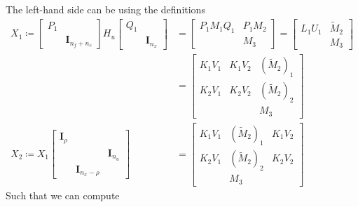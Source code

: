 \documentclass{article}
\begin{document}
The left-hand side can be using the definitions
\begin{align}
    X_1 \coloneqq \begin{bmatrix} P_1 & \\ & \bm{I}_{n_f + n_c} \end{bmatrix}
    H_u
    \begin{bmatrix} Q_1 & \\ & \bm{I}_{n_x}\end{bmatrix}
    &= \begin{bmatrix} P_1 M_1 Q_1 & P_1 M_2 \\ & M_3 \end{bmatrix}
     = \begin{bmatrix} L_1 U_1 & \tilde{M}_2 \\ & M_3 \end{bmatrix}\\
    &= \begin{bmatrix} K_1 V_1 & K_1 V_2 & (\tilde{M}_2)_1 \\ K_2 V_1 & K_2 V_2 & (\tilde{M}_2)_2 \\ & & M_3 \end{bmatrix}\\
    X_2 \coloneqq X_1 \begin{bmatrix} \bm{I}_\rho & & \\ & & \bm{I}_{n_u} \\ & \bm{I}_{n_x-\rho} & \end{bmatrix}
    &= \begin{bmatrix} K_1 V_1 & (\tilde{M}_2)_1 & K_1 V_2 \\ K_2 V_1 & (\tilde{M}_2)_2 & K_2 V_2 \\ & M_3 & \end{bmatrix}
\end{align}
Such that we can compute
\end{document}
